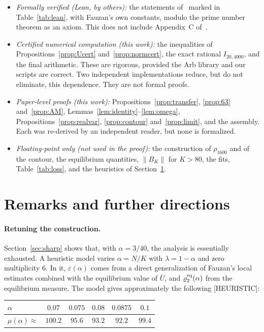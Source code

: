 \documentclass[11pt]{article}
\theoremstyle{remark}
\newcommand{\Ubar}{\overline{U}}
\begin{document}
\begin{itemize}
\item \emph{Formally verified (Lean, by others):} the statements of~\cite{F} marked in Table~\ref{tab:lean}, with Fauzan's own constants, modulo the prime number theorem as an axiom. This does not include Appendix~C of~\cite{F}.
\item \emph{Certified numerical computation (this work):} the inequalities of Propositions~\ref{prop:Ucert} and~\ref{prop:normcert}, the exact rational $I_{20,4000}$, and the final arithmetic. These are rigorous, provided the Arb library and our scripts are correct. Two independent implementations reduce, but do not eliminate, this dependence. They are not formal proofs.
\item \emph{Paper-level proofs (this work):} Propositions~\ref{prop:transfer}, \ref{prop:63} and~\ref{prop:AM}, Lemmas~\ref{lem:identity}--\ref{lem:omega}, Propositions~\ref{prop:realvar}, \ref{prop:contour} and~\ref{prop:limit}, and the assembly. Each was re-derived by an independent reader, but none is formalized.
\item \emph{Floating-point only (not used in the proof):} the construction of $\rho_{1600}$ and of the contour, the equilibrium quantities, $\|B_K\|$ for $K>80$, the fits, Table~\ref{tab:loss}, and the heuristics of Section~\ref{sec:remarks}.
\end{itemize}

\section{Remarks and further directions}\label{sec:remarks}

\paragraph{Retuning the construction.} Section~\ref{sec:sharp} shows that, with $\alpha=3/40$, the analysis is essentially exhausted. A heuristic model varies $\alpha=N/K$ with $\lambda=1-\alpha$ and zero multiplicity $6$. In it, $\varepsilon(\alpha)$ comes from a direct generalization of Fauzan's local estimates combined with the equilibrium value of $\Ubar$, and $\varrho_2^{\rm eq}(\alpha)$ from the equilibrium measure. The model gives approximately the following [HEURISTIC]:

\begin{center}
\begin{tabular}{lccccc}
\toprule
$\alpha$ & $0.07$ & $0.075$ & $0.08$ & $0.0875$ & $0.1$\\
\midrule
$\mu(\alpha)\approx$ & $100.2$ & $95.6$ & $93.2$ & $92.2$ & $99.4$\\
\bottomrule
\end{tabular}
\end{center}
\end{document}
